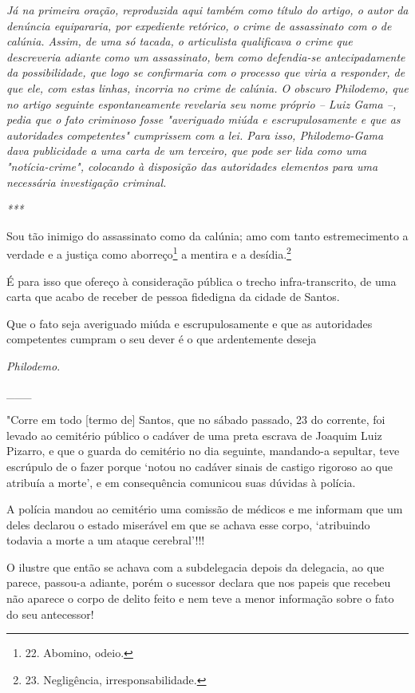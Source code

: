 \emph{Já na primeira oração, reproduzida aqui também como título do
artigo, o autor da denúncia equipararia, por expediente retórico, o
crime de assassinato com o de calúnia. Assim, de uma só tacada, o
articulista qualificava o crime que descreveria adiante como um
assassinato, bem como defendia-se antecipadamente da possibilidade, que
logo se confirmaria com o processo que viria a responder, de que ele,
com estas linhas, incorria no crime de calúnia. O obscuro Philodemo, que
no artigo seguinte espontaneamente revelaria seu nome próprio -- Luiz
Gama --, pedia que o fato criminoso fosse "averiguado miúda e
escrupulosamente e que as autoridades competentes" cumprissem com a lei.
Para isso, Philodemo-Gama dava publicidade a uma carta de um terceiro,
que pode ser lida como uma "notícia-crime", colocando à disposição das
autoridades elementos para uma necessária investigação criminal.}

\emph{***}

Sou tão inimigo do assassinato como da calúnia; amo com tanto
estremecimento a verdade e a justiça como aborreço\footnote{22. Abomino,
  odeio.} a mentira e a desídia.\footnote{23. Negligência,
  irresponsabilidade.}

É para isso que ofereço à consideração pública o trecho
infra-transcrito, de uma carta que acabo de receber de pessoa fidedigna
da cidade de Santos.

Que o fato seja averiguado miúda e escrupulosamente e que as autoridades
competentes cumpram o seu dever é o que ardentemente deseja

\emph{Philodemo}.

\_\_\_

"Corre em todo {[}termo de{]} Santos, que no sábado passado, 23 do
corrente, foi levado ao cemitério público o cadáver de uma preta escrava
de Joaquim Luiz Pizarro, e que o guarda do cemitério no dia seguinte,
mandando-a sepultar, teve escrúpulo de o fazer porque `notou no cadáver
sinais de castigo rigoroso ao que atribuía a morte', e em consequência
comunicou suas dúvidas à polícia.

A polícia mandou ao cemitério uma comissão de médicos e me informam que
um deles declarou o estado miserável em que se achava esse corpo,
`atribuindo todavia a morte a um ataque cerebral'!!!

O ilustre que então se achava com a subdelegacia depois da delegacia, ao
que parece, passou-a adiante, porém o sucessor declara que nos papeis
que recebeu não aparece o corpo de delito feito e nem teve a menor
informação sobre o fato do seu antecessor!


